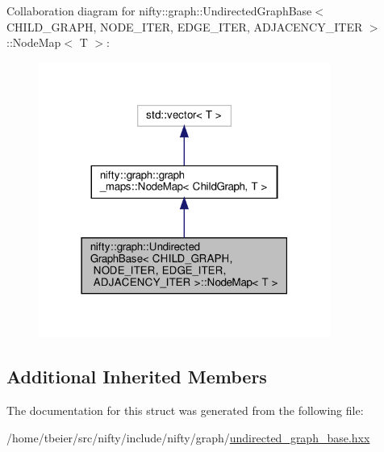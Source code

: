 Collaboration diagram for nifty\+:\+:graph\+:\+:Undirected\+Graph\+Base$<$ C\+H\+I\+L\+D\+\_\+\+G\+R\+A\+PH, N\+O\+D\+E\+\_\+\+I\+T\+ER, E\+D\+G\+E\+\_\+\+I\+T\+ER, A\+D\+J\+A\+C\+E\+N\+C\+Y\+\_\+\+I\+T\+ER $>$\+:\+:Node\+Map$<$ T $>$\+:
\nopagebreak
\begin{figure}[H]
\begin{center}
\leavevmode
\includegraphics[width=271pt]{structnifty_1_1graph_1_1UndirectedGraphBase_1_1NodeMap__coll__graph}
\end{center}
\end{figure}
\subsection*{Additional Inherited Members}


The documentation for this struct was generated from the following file\+:\begin{DoxyCompactItemize}
\item 
/home/tbeier/src/nifty/include/nifty/graph/\hyperlink{undirected__graph__base_8hxx}{undirected\+\_\+graph\+\_\+base.\+hxx}\end{DoxyCompactItemize}
